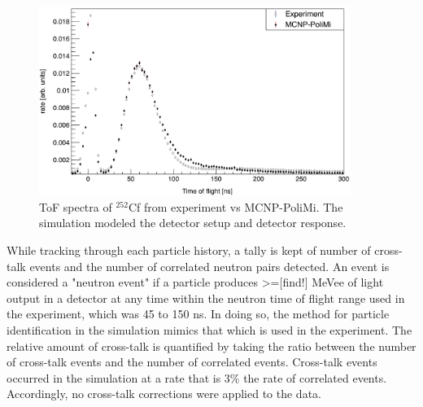 \begin{figure}
    \centering
    \includegraphics[width = 0.9\textwidth]{Content/Methods/Cf252MCNPVsEXP.png}
    \caption{ToF spectra of $^{252}$Cf from experiment vs MCNP-PoliMi.
    The simulation modeled the detector setup and detector response.}
    \label{fig:Cf252MCNPVsEXP}
\end{figure}
While tracking through each particle history, a tally is kept of number of cross-talk events and the number of correlated neutron pairs detected.
An event is considered a "neutron event" if a particle produces >=[find!] MeVee of light output in a detector at any time within the neutron time of flight range used in the experiment, which was 45 to 150 ns.
In doing so, the method for particle identification in the simulation mimics that which is used in the experiment.
The relative amount of cross-talk is quantified by taking the ratio between the number of cross-talk events and the number of correlated events.
Cross-talk events occurred in the simulation at a rate that is 3\% the rate of correlated events.
Accordingly, no cross-talk corrections were applied to the data.

